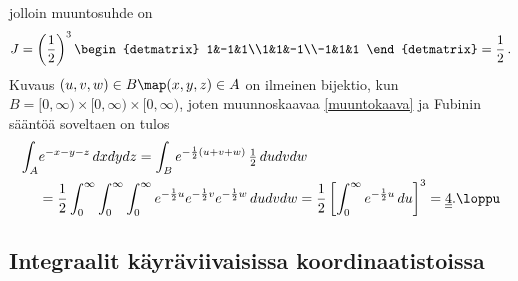 jolloin muuntosuhde on
\[
J = \left(\frac{1}{2}\right)^3 \begin{detmatrix} 1&-1&1\\1&1&-1\\-1&1&1 \end{detmatrix} 
  = \frac{1}{2}\,.
\] 
Kuvaus $(u,v,w) \in B \map (x,y,z) \in A$ on ilmeinen bijektio, kun
$B = [0,\infty)\times[0,\infty)\times[0,\infty)$, joten muunnoskaavaa \eqref{muuntokaava}
ja Fubinin sääntöä soveltaen on tulos
\begin{align*} 
\int_A &e^{-x-y-z}\,dxdydz = \int_B e^{-\frac{1}{2}(u+v+w)}\,\tfrac{1}{2}\,dudvdw \\ 
       &= \frac{1}{2}\int_0^\infty\int_0^\infty\int_0^\infty 
           e^{-\frac{1}{2}u}e^{-\frac{1}{2}v}e^{-\frac{1}{2}w}\,dudvdw
        = \frac{1}{2}\left[\int_0^\infty e^{-\frac{1}{2}u}\,du\right]^3 
        = \underline{\underline{4}}. \loppu
\end{align*}

\subsection{Integraalit käyräviivaisissa koordinaatistoissa}

